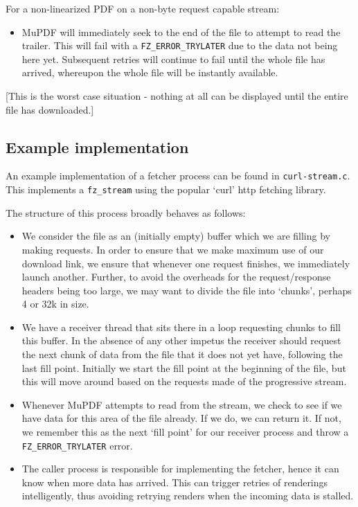 \documentclass[oneside]{book}
\begin{document}
\begin{itemize}
   For a non-linearized PDF on a non-byte request capable stream:

\begin{itemize}

\item
MuPDF will immediately seek to the end of the file to attempt to read the trailer. This will fail with a \texttt{FZ\_ERROR\_TRYLATER} due to the data not being here yet. Subsequent retries will continue to fail until the whole file has arrived, whereupon the whole file will be instantly available.
\end{itemize}

[This is the worst case situation - nothing at all can be displayed until the entire file has downloaded.]
\end{itemize}

\subsection{Example implementation}

An example implementation of a fetcher process can be found in \texttt{curl-stream.c}. This implements a \texttt{fz\_stream} using the popular `curl' http fetching library.

The structure of this process broadly behaves as follows:

\begin{itemize}

\item
We consider the file as an (initially empty) buffer which we are filling by making requests. In order to ensure that we make maximum use of our download link, we ensure that whenever one request finishes, we immediately launch another. Further, to avoid the overheads for the request/response headers being too large, we may want to divide the file into `chunks', perhaps 4 or 32k in size.

\item
We have a receiver thread that sits there in a loop requesting chunks to fill this buffer. In the absence of any other impetus the receiver should request the next chunk of data from the file that it does not yet have, following the last fill point. Initially we start the fill point at the beginning of the file, but this will move around based on the requests made of the progressive stream.

\item
Whenever MuPDF attempts to read from the stream, we check to see if we have data for this area of the file already. If we do, we can return it. If not, we remember this as the next `fill point' for our receiver process and throw a \texttt{FZ\_ERROR\_TRYLATER} error.

\item
The caller process is responsible for implementing the fetcher, hence it can know when more data has arrived. This can trigger retries of renderings intelligently, thus avoiding retrying renders when the incoming data is stalled.

\end{itemize}
\end{document}
